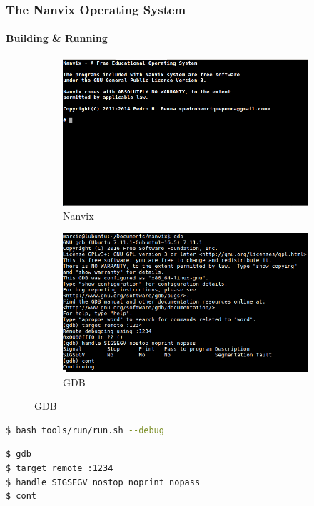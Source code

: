 \documentclass{beamer}
\begin{document}
	\begin{frame}[containsverbatim]
	\frametitle{The Nanvix Operating System}
	\framesubtitle{Building \& Running}
		\begin{figure}[t]
			\captionsetup[subfigure]{
				labelformat=empty}
				\begin{subfigure}{0.42\linewidth}
					\caption{\scriptsize{Nanvix}}
					\includegraphics[width=\linewidth]{img/terminal-nanvix.png}
				\end{subfigure}
				\quad\quad\quad\quad
				\begin{subfigure}{0.42\linewidth}
					\caption{\scriptsize{GDB}}
					\includegraphics[width=\linewidth]{img/terminal-GDB.png}
				\end{subfigure}
		\end{figure}

		\begin{minipage}{.4\textwidth}
			\begin{lstlisting}[language=bash,numbers=none,frame=single,basicstyle=\tiny\ttfamily,]
$ bash tools/run/run.sh --debug
			\end{lstlisting}
		\end{minipage}
		\hfill
		\begin{minipage}{.48\textwidth}
			\begin{lstlisting}[language=bash,numbers=none,frame=single,basicstyle=\tiny\ttfamily,]
$ gdb
$ target remote :1234
$ handle SIGSEGV nostop noprint nopass
$ cont
			\end{lstlisting}
			

\end{minipage}
\end{frame}
\end{document}
